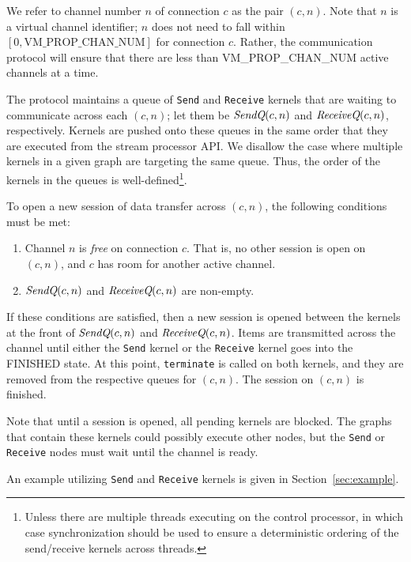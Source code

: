  We refer to channel number $n$ of
connection $c$ as the pair $(c, n)$.  Note that $n$ is a virtual
channel identifier; $n$ does not need to fall within $[0,
\mbox{VM\_PROP\_CHAN\_NUM}]$ for connection $c$.  Rather, the
communication protocol will ensure that there are less than
VM\_PROP\_CHAN\_NUM active channels at a time.

The protocol maintains a queue of {\tt Send} and {\tt Receive} kernels
that are waiting to communicate across each $(c, n)$; let them be
$\mbox{\it SendQ}(c, n)$ and $\mbox{\it ReceiveQ}(c, n)$, respectively.  Kernels
are pushed onto these queues in the same order that they are executed
from the stream processor API.  We disallow the case where multiple
kernels in a given graph are targeting the same queue.  Thus, the
order of the kernels in the queues is well-defined\footnote{Unless
there are multiple threads executing on the control processor, in
which case synchronization should be used to ensure a deterministic
ordering of the send/receive kernels across threads.}.

To open a new session of data transfer across $(c, n)$, the following
conditions must be met:
\begin{enumerate}

\item Channel $n$ is {\it free} on connection $c$.  That is, no other
session is open on $(c, n)$, and $c$ has room for another active
channel.

\item $\mbox{\it SendQ}(c, n)$ and $\mbox{\it ReceiveQ}(c, n)$ are non-empty.

\end{enumerate}
If these conditions are satisfied, then a new session is opened
between the kernels at the front of $\mbox{\it SendQ}(c, n)$ and
$\mbox{\it ReceiveQ}(c, n)$.  Items are transmitted across the channel until
either the {\tt Send} kernel or the {\tt Receive} kernel goes into the
FINISHED state.  At this point, {\tt terminate} is called on both
kernels, and they are removed from the respective queues for $(c, n)$.
The session on $(c, n)$ is finished.

Note that until a session is opened, all pending kernels are blocked.
The graphs that contain these kernels could possibly execute other
nodes, but the {\tt Send} or {\tt Receive} nodes must wait until the
channel is ready.

 An example utilizing {\tt Send} and {\tt Receive}
kernels is given in Section~\ref{sec:example}.

